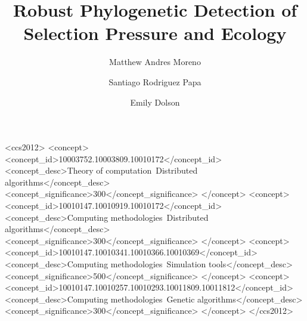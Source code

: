 \documentclass[dvipsnames,format=sigconf,anonymous=true]{acmart}
\begin{document}
\title{Robust Phylogenetic Detection of Selection Pressure and Ecology}

\author{Matthew Andres Moreno}

\author{Santiago Rodriguez Papa}

\author{Emily Dolson}

\renewcommand{\shortauthors}{Moreno et al.}





% 
\begin{CCSXML}
  <ccs2012>
  <concept>
  <concept_id>10003752.10003809.10010172</concept_id>
  <concept_desc>Theory of computation~Distributed algorithms</concept_desc>
  <concept_significance>300</concept_significance>
  </concept>
  <concept>
  <concept_id>10010147.10010919.10010172</concept_id>
  <concept_desc>Computing methodologies~Distributed algorithms</concept_desc>
  <concept_significance>300</concept_significance>
  </concept>
  <concept>
  <concept_id>10010147.10010341.10010366.10010369</concept_id>
  <concept_desc>Computing methodologies~Simulation tools</concept_desc>
  <concept_significance>500</concept_significance>
  </concept>
  <concept>
  <concept_id>10010147.10010257.10010293.10011809.10011812</concept_id>
  <concept_desc>Computing methodologies~Genetic algorithms</concept_desc>
  <concept_significance>300</concept_significance>
  </concept>
  </ccs2012>
\end{CCSXML}
\end{document}
